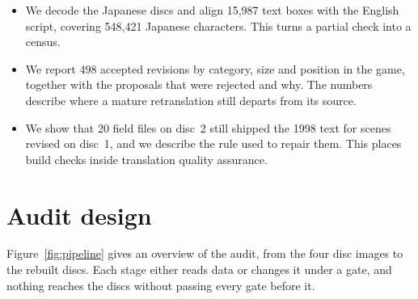 \documentclass[11pt]{article}
\begin{document}
\begin{itemize}
\item {} We decode the Japanese
discs and align 15,987 text boxes with the English script, covering
548,421 Japanese characters. This turns a partial check into a census.
\item {} We report 498 accepted
revisions by category, size and position in the game, together with the
proposals that were rejected and why. The numbers describe where a
mature retranslation still departs from its source.
\item {} We show that 20 field
files on disc~2 still shipped the 1998 text for scenes revised on
disc~1, and we describe the rule used to repair them. This places build
checks inside translation quality assurance.
\end{itemize}

\section{Audit design}

Figure~\ref{fig:pipeline} gives an overview of the audit, from the four
disc images to the rebuilt discs. Each stage either reads data or changes
it under a gate, and nothing reaches the discs without passing every gate
before it.
\end{document}
